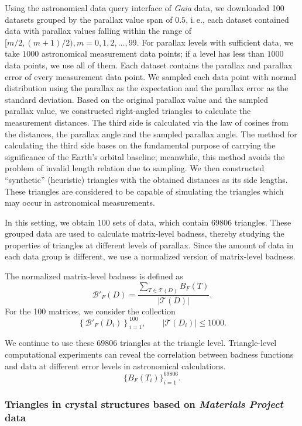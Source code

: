 \documentclass[11pt]{article}
\begin{document}
Using the astronomical data query interface of \textit{Gaia} data, we downloaded 100 datasets grouped by the parallax value span of \(0.5\), i.\,e., each dataset contained data with parallax values falling within the range of 
\([m/2, (m+1)/2), m = 0, 1, 2, \ldots, 99\). 
For parallax levels with sufficient data, we take \(1000\) astronomical measurement data points; if a level has less than \(1000\) data points, we use all of them.
Each dataset contains the parallax and parallax error of every measurement data point. We sampled each data point with normal distribution using the parallax as the expectation and the parallax error as the standard deviation. Based on the original parallax value and the sampled parallax value, we constructed right-angled triangles to calculate the measurement distances.
The third side is calculated via the law of cosines from the distances, the parallax angle and the sampled parallax angle. The method for calculating the third side bases on the fundamental purpose of carrying the significance of the Earth's orbital baseline; meanwhile, this method avoids the problem of invalid length relation due to sampling.
We then constructed ``synthetic'' (heuristic) triangles with the obtained distances as its side lengths. These triangles are considered to be capable of simulating the triangles which may occur in astronomical measurements.

In this setting, we obtain \(100\) sets of data, which contain \(69806\) triangles. These grouped data are used to calculate matrix-level badness, thereby studying the properties of triangles at different levels of parallax. 
Since the amount of data in each data group is different, we use a normalized version of matrix-level badness.

The normalized matrix-level badness is defined as
\[
\mathcal{B}'_F(D)
=
\frac{\displaystyle
\sum_{T\in\mathcal{T}(D)} B_F(T)}
{|\mathcal{T}(D)|}.
\]
For the 100 matrices, we consider the collection
\[
\left\{\mathcal{B}'_F(D_i)\right\}_{i=1}^{100},
\qquad
|\mathcal{T}(D_i)|\leq 1000.
\]

We continue to use these \(69806\) triangles at the triangle level. Triangle-level computational experiments can reveal the correlation between badness functions and data at different error levels in astronomical calculations.
\[\{B_F(T_i)\}_{i=1}^{69806}.\]

\subsubsection{Triangles in crystal structures based on \textit{Materials Project} data}
\label{sec:data_MP}
\end{document}
